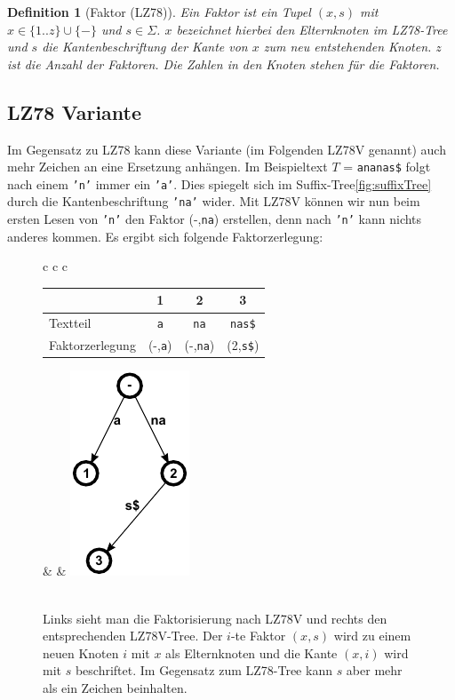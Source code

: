 \documentclass[a4paper,11pt]{scrartcl}%
\theoremstyle{change}
\theoremstyle{nonumberplain}
\theoremstyle{change}
\newtheorem{definition}[theorem]{Definition}
\theoremstyle{nonumberplain}
\theoremstyle{change}
\theoremstyle{nonumberplain}
\begin{document}
\begin{definition}[Faktor (LZ78)]
	Ein \textit{Faktor} ist ein Tupel $(x,s)$ mit $x \in \{1..z\} \cup \{-\}$ und $s \in \Sigma$. $x$ bezeichnet hierbei den Elternknoten im LZ78-Tree und $s$ die Kantenbeschriftung der Kante von $x$ zum neu entstehenden Knoten. $z$ ist die Anzahl der Faktoren. Die Zahlen in den Knoten stehen für die Faktoren.
\end{definition}	
	

\subsection{LZ78 Variante}	

Im Gegensatz zu LZ78 kann diese Variante (im Folgenden LZ78V genannt) auch mehr Zeichen an eine Ersetzung anhängen.
	Im Beispieltext $T$ = \texttt{ananas\$} folgt nach einem \texttt{'n'} immer ein \texttt{'a'}. Dies spiegelt sich im Suffix-Tree\ref{fig:suffixTree} durch die Kantenbeschriftung \texttt{'na'} wider. Mit LZ78V können wir nun beim ersten Lesen von \texttt{'n'} den Faktor (-,\texttt{na}) erstellen, denn nach \texttt{'n'} kann nichts anderes kommen. Es ergibt sich folgende Faktorzerlegung:\\
	\begin{figure}[h]
	\begin{tabular}[t]{c c c}
		\begin{tabular}[b]{l c c c}\hline
			& 1 & 2 & 3  \\ \hline
  		Textteil & \texttt{a} & \texttt{na} & \texttt{nas\$} \\ \hline
  		Faktorzerlegung & (-,\texttt{a}) & (-,\texttt{na}) & (2,\texttt{s\$}) \\ \hline
		\end{tabular} & \hspace{2cm} & \includegraphics{./pics/ananas_LZ78VTree}\\\\
	\end{tabular}
	\caption{Links sieht man die Faktorisierung nach LZ78V und rechts den entsprechenden LZ78V-Tree. Der $i$-te Faktor $(x,s)$ wird zu einem neuen Knoten $i$ mit $x$ als Elternknoten und die Kante $(x,i)$ wird mit $s$ beschriftet. Im Gegensatz zum LZ78-Tree kann $s$ aber mehr als ein Zeichen beinhalten.}
	\label{fig:lz78v}
	\end{figure}
	
\end{document}
